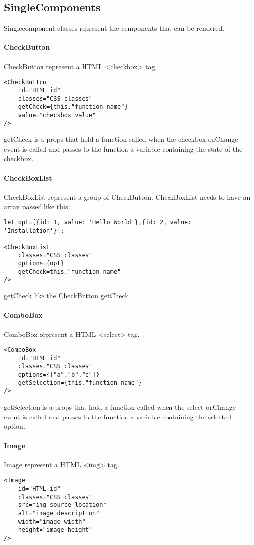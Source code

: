 \subsection{SingleComponents}
\begin{flushleft}
Singlecomponent classes represent the components that can be rendered.

\paragraph{CheckButton}
CheckButton represent a HTML <checkbox> tag.
\begin{verbatim}
<CheckButton
    id="HTML id"
    classes="CSS classes"
    getCheck={this."function name"}
    value="checkbox value"
/>
\end{verbatim}
getCheck is a props that hold a function called when the checkbox onChange event is called and passes to the function a variable containing the state of the checkbox.
\paragraph{CheckBoxList}
CheckBoxList represent a group of CheckButton.
CheckBoxList needs to have an array passed like this:
\begin{verbatim}
let opt=[{id: 1, value: 'Hello World'},{id: 2, value: 'Installation'}];

<CheckBoxList
    classes="CSS classes"
    options={opt}
    getCheck=this."function name"
/>
\end{verbatim}
getCheck like the CheckButton getCheck.

    \paragraph{ComboBox}
ComboBox represent a HTML <select> tag.
\begin{verbatim}
<ComboBox
    id="HTML id"
    classes="CSS classes"
    options={["a","b","c"]}
    getSelection={this."function name"}
/>
\end{verbatim}
getSelection is a props that hold a function called when the select onChange event is called and passes to the function a variable containing the selected option.
    \paragraph{Image}
Image represent a HTML <img> tag.

\begin{verbatim}
<Image
    id="HTML id"
    classes="CSS classes"
    src="img source location"
    alt="image description"
    width="image width"
    height="image height"
/>
\end{verbatim}


\end{flushleft}
